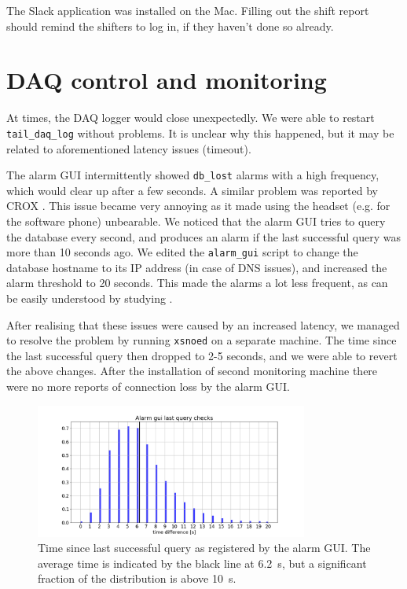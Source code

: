 \documentclass[a4paper,10pt]{article}
\begin{document}
The Slack application was installed on the Mac. Filling out the shift report should remind the shifters to log in, if they haven't done so already.


\section{DAQ control and monitoring}
At times, the DAQ logger would close unexpectedly. We were able to restart {\tt tail\_daq\_log} without problems. It is unclear why this happened, but it may be related to aforementioned latency issues (timeout).

The alarm GUI intermittently showed {\tt db\_lost} alarms with a high frequency, which would clear up after a few seconds. A similar problem was reported by CROX \cite{doc5051}. This issue became very annoying as it made using the headset (e.g. for the software phone) unbearable. We noticed that the alarm GUI tries to query the database every second, and produces an alarm if the last successful query was more than 10 seconds ago. We edited the {\tt alarm\_gui} script to change the database hostname to its IP address (in case of DNS issues), and increased the alarm threshold to 20 seconds. This made the alarms a lot less frequent, as can be easily understood by studying .

After realising that these issues were caused by an increased latency, we managed to resolve the problem by running {\tt xsnoed} on a separate machine. The time since the last successful query then dropped to 2-5 seconds, and we were able to revert the above changes. After the installation of second monitoring machine there were no more reports of connection loss by the alarm GUI.

\begin{figure}[htp]
	\centering
	\includegraphics[width=0.8\textwidth,trim={25mm 4mm 32mm 13mm},clip]{images/alarm_gui_checks}
	\caption{Time since last successful query as registered by the alarm GUI. The average time is indicated by the black line at 6.2~s, but a significant fraction of the distribution is above 10~s.}
	\label{alarm_gui}
\end{figure}
\end{document}
